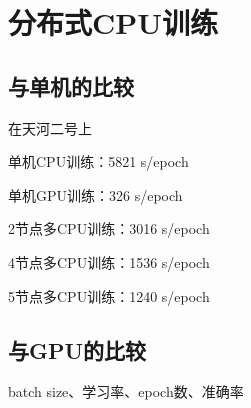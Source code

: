 \section{分布式CPU训练}

\subsection{与单机的比较}

在天河二号上

单机CPU训练：5821 s/epoch

单机GPU训练：326 s/epoch

2节点多CPU训练：3016 s/epoch

4节点多CPU训练：1536 s/epoch

5节点多CPU训练：1240 s/epoch

\subsection{与GPU的比较}

batch size、学习率、epoch数、准确率